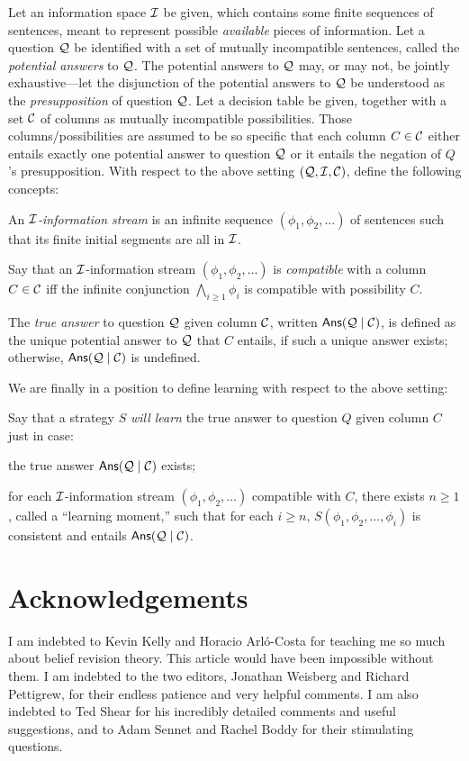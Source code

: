 Let an information space $\cal I$ be given, which contains some finite sequences of sentences, meant to represent possible {\em available} pieces of information. Let a question $\cal Q$ be identified with a set of mutually incompatible sentences, called the {\em potential answers} to $\cal Q$. The potential answers to $\cal Q$ may, or may not, be jointly exhaustive---let the disjunction of the potential answers to $\cal Q$ be understood as the {\em presupposition} of question $\cal Q$. Let a decision table be given, together with a set ${\cal C}$ of columns as mutually incompatible possibilities. Those columns/possibilities are assumed to be so specific that each column $C \in {\cal C}$ either entails exactly one potential answer to question $\cal Q$ or it entails the negation of $Q$'s presupposition. With respect to the above setting $({\cal Q}, {\cal I}, {\cal C})$, define the following concepts: \op

	\im An {\em $\cal I$-information stream} is an infinite sequence $(\phi_1, \phi_2, \ldots)$ of sentences such that its finite initial segments are all in $\cal I$.
	
	\im Say that an $\cal I$-information stream $(\phi_1, \phi_2, \ldots)$ is {\em compatible} with a column $C \in {\cal C}$ iff the infinite conjunction $\bigwedge_{i \ge 1} \phi_i$ is compatible with possibility $C$.
	
	\im The {\em true answer} to question $\cal Q$ given column $\cal C$, written $\mathsf{Ans}({\cal Q} \mid {\cal C})$, is defined as the unique potential answer to $\cal Q$ that $C$ entails, if such a unique answer exists; otherwise, $\mathsf{Ans}({\cal Q} \mid {\cal C})$ is undefined. 
	
\ed We are finally in a position to define learning with respect to the above setting: \op

	\im Say that a strategy $S$ {\em will learn} the true answer to question $Q$ given column $C$ just in case: \op
	
		\im[(1)] the true answer $\mathsf{Ans}({\cal Q} \mid {\cal C})$ exists;
		
		\im[(2)] for each $\cal I$-information stream $(\phi_1, \phi_2, \ldots)$ compatible with $C$, there exists $n \ge 1$, called a ``learning moment,'' such that for each $i\ge n$, $S(\phi_1, \phi_2, \ldots, \phi_i)$ is consistent and entails $\mathsf{Ans}({\cal Q} \mid {\cal C})$.
	\ed
\ed   



\section*{Acknowledgements}

I am indebted to Kevin Kelly and Horacio Arl\'{o}-Costa for teaching me so much about belief revision theory. This article would have been impossible without them. I am indebted to the two editors, Jonathan Weisberg and Richard Pettigrew, for their endless patience and very helpful comments. I am also indebted to Ted Shear for his incredibly detailed comments and useful suggestions, and to Adam Sennet and Rachel Boddy for their stimulating questions.